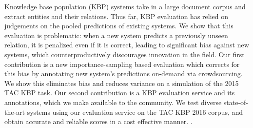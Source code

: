 Knowledge base population (KBP) systems take in a large document corpus and extract entities and their relations.
Thus far, KBP evaluation has relied on judgements on the pooled predictions of existing systems.
We show that this evaluation is problematic:
when a new system predicts a previously unseen relation, it is penalized even if it is correct,  %
leading to significant bias against new systems, which counterproductively discourages innovation in the field.
Our first contribution is a new importance-sampling based evaluation which corrects for this bias by annotating new system's predictions on-demand via crowdsourcing.
We show this eliminates bias and reduces variance on a simulation of the 2015 TAC KBP task. %
Our second contribution is a KBP evaluation service and its annotations, which we make available to the community.
We test diverse state-of-the-art systems using our evaluation service on the TAC KBP 2016 corpus, and obtain
accurate and reliable scores in a cost effective manner. 
.


